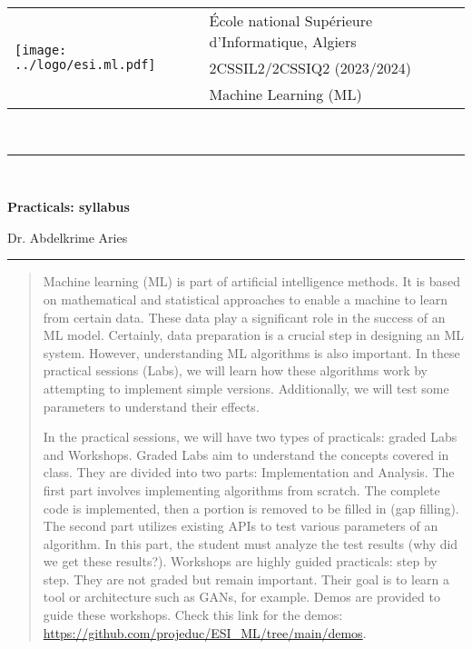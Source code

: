\documentclass[11pt, a4paper]{article}
\begin{document}
\pagestyle{fancy}

\noindent
\begin{tabular}{ll}
\multirow{3}{*}{\texttt{[image: ../logo/esi.ml.pdf]}} & \'Ecole national Supérieure d'Informatique, Algiers\\
& 2CSSIL2/2CSSIQ2 (2023/2024)\\
& Machine Learning (ML)
\end{tabular}\\[2pt]
\noindent\rule{\textwidth}{1pt}\\[-0.5cm]
\begin{center}
{\LARGE \textbf{Practicals: syllabus}}
\begin{flushright}
	Dr. Abdelkrime Aries
\end{flushright}
\end{center}\vspace{-0.5cm}
\noindent\rule{\textwidth}{1pt}

\begin{abstract}
	Machine learning (ML) is part of artificial intelligence methods. 
	It is based on mathematical and statistical approaches to enable a machine to learn from certain data. 
	These data play a significant role in the success of an ML model.
	Certainly, data preparation is a crucial step in designing an ML system. 
	However, understanding ML algorithms is also important. 
	In these practical sessions (Labs), we will learn how these algorithms work by attempting to implement simple versions. 
	Additionally, we will test some parameters to understand their effects.
	
	In the practical sessions, we will have two types of practicals: graded Labs and Workshops. 
	Graded Labs aim to understand the concepts covered in class. 
	They are divided into two parts: Implementation and Analysis. 
	The first part involves implementing algorithms from scratch. 
	The complete code is implemented, then a portion is removed to be filled in (gap filling). 
	The second part utilizes existing APIs to test various parameters of an algorithm. 
	In this part, the student must analyze the test results (why did we get these results?).
	Workshops are highly guided practicals: step by step. 
	They are not graded but remain important. 
	Their goal is to learn a tool or architecture such as GANs, for example. 
	Demos are provided to guide these workshops. 
	Check this link for the demos: \url{https://github.com/projeduc/ESI_ML/tree/main/demos}.
\end{abstract}
\end{document}
